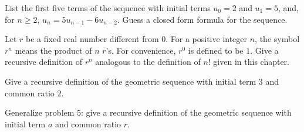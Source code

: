 \begin{prob}
 
 List the first five terms of the sequence with initial terms
$u_0=2$ and $u_1=5$, and, for $n\geq 2$, $u_n = 5u_{n-1}-6u_{n-2}$.
Guess a closed %
 form formula for the sequence. 
  
\end{prob}

\begin{prob} 

 Let $r$ be a fixed real number different from $0$.
 For a positive integer $n$,
the symbol $r^n$ means the product of $n$ $r$'s. For convenience,
$r^0$ is defined to be $1$. Give a recursive definition of $r^n$
analogous to the definition of $n!$ given in this chapter.
  
\end{prob}

\begin{prob}
 
 Give a recursive definition of the geometric sequence
with initial term $3$ and common ratio $2$.
  
\end{prob}

\begin{prob}
 
 Generalize problem 5: give a recursive definition of  the geometric sequence
with initial term $a$ and common ratio $r$.
  
\end{prob}
 

